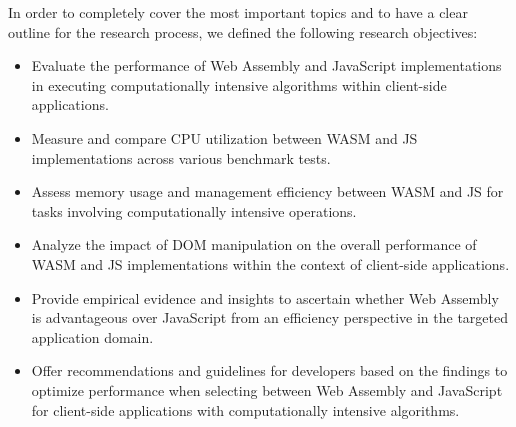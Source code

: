 In order to completely cover the most important topics and to have a clear outline for the research process, we defined the following research objectives:

\begin{itemize}
    \item Evaluate the performance of Web Assembly and JavaScript implementations in executing computationally intensive algorithms within client-side applications.
    \item Measure and compare CPU utilization between WASM and JS implementations across various benchmark tests.
    \item Assess memory usage and management efficiency between WASM and JS for tasks involving computationally intensive operations.
    \item Analyze the impact of DOM manipulation on the overall performance of WASM and JS implementations within the context of client-side applications.
    \item Provide empirical evidence and insights to ascertain whether Web Assembly is advantageous over JavaScript from an efficiency perspective in the targeted application domain.
    \item Offer recommendations and guidelines for developers based on the findings to optimize performance when selecting between Web Assembly and JavaScript for client-side applications with computationally intensive algorithms.
\end{itemize}
